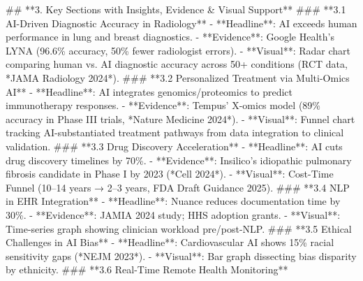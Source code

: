 \documentclass{article}%
\begin{document}
%
\#\# **3. Key Sections with Insights, Evidence \& Visual Support**\newline%
%
\#\#\# **3.1 AI{-}Driven Diagnostic Accuracy in Radiology**\newline%
%
{-} **Headline**: AI exceeds human performance in lung and breast diagnostics.\newline%
%
{-} **Evidence**: Google Health’s LYNA (96.6\% accuracy, 50\% fewer radiologist errors).\newline%
%
{-} **Visual**: Radar chart comparing human vs. AI diagnostic accuracy across 50+ conditions (RCT data, *JAMA Radiology 2024*).\newline%
%
\#\#\# **3.2 Personalized Treatment via Multi{-}Omics AI**\newline%
%
{-} **Headline**: AI integrates genomics/proteomics to predict immunotherapy responses.\newline%
%
{-} **Evidence**: Tempus’ X{-}omics model (89\% accuracy in Phase III trials, *Nature Medicine 2024*).\newline%
%
{-} **Visual**: Funnel chart tracking AI{-}substantiated treatment pathways from data integration to clinical validation.\newline%
%
\#\#\# **3.3 Drug Discovery Acceleration**\newline%
%
{-} **Headline**: AI cuts drug discovery timelines by 70\%.\newline%
%
{-} **Evidence**: Insilico’s idiopathic pulmonary fibrosis candidate in Phase I by 2023 (*Cell 2024*).\newline%
%
{-} **Visual**: Cost{-}Time Funnel (10–14 years → 2–3 years, FDA Draft Guidance 2025).\newline%
%
\#\#\# **3.4 NLP in EHR Integration**\newline%
%
{-} **Headline**: Nuance reduces documentation time by 30\%.\newline%
%
{-} **Evidence**: JAMIA 2024 study; HHS adoption grants.\newline%
%
{-} **Visual**: Time{-}series graph showing clinician workload pre/post{-}NLP.\newline%
%
\#\#\# **3.5 Ethical Challenges in AI Bias**\newline%
%
{-} **Headline**: Cardiovascular AI shows 15\% racial sensitivity gaps (*NEJM 2023*).\newline%
%
{-} **Visual**: Bar graph dissecting bias disparity by ethnicity.\newline%
%
\#\#\# **3.6 Real{-}Time Remote Health Monitoring**\newline%
\end{document}
